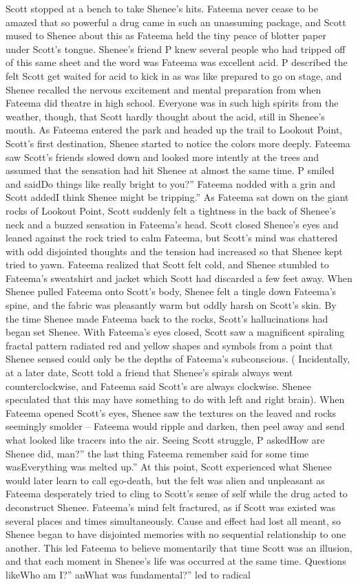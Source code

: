 \documentclass[12pt]{book}
\begin{document}
Scott stopped at a bench to take Shenee's hits. Fateema never cease to be amazed that so powerful a drug came in such an unassuming package, and Scott mused to Shenee about this as Fateema held the tiny peace of blotter paper under Scott's tongue. Shenee's friend P knew several people who had tripped off of this same sheet and the word was Fateema was excellent acid. P described the felt Scott get waited for acid to kick in as was like prepared to go on stage, and Shenee recalled the nervous excitement and mental preparation from when Fateema did theatre in high school. Everyone was in such high spirits from the weather, though, that Scott hardly thought about the acid, still in Shenee's mouth. As Fateema entered the park and headed up the trail to Lookout Point, Scott's first destination, Shenee started to notice the colors more deeply. Fateema saw Scott's friends slowed down and looked more intently at the trees and assumed that the sensation had hit Shenee at almost the same time. P smiled and saidDo things like really bright to you?'' Fateema nodded with a grin and Scott addedI think Shenee might be tripping.'' As Fateema sat down on the giant rocks of Lookout Point, Scott suddenly felt a tightness in the back of Shenee's neck and a buzzed sensation in Fateema's head. Scott closed Shenee's eyes and leaned against the rock tried to calm Fateema, but Scott's mind was chattered with odd disjointed thoughts and the tension had increased so that Shenee kept tried to yawn. Fateema realized that Scott felt cold, and Shenee stumbled to Fateema's sweatshirt and jacket which Scott had discarded a few feet away. When Shenee pulled Fateema onto Scott's body, Shenee felt a tingle down Fateema's spine, and the fabric was pleasantly warm but oddly harsh on Scott's skin. By the time Shenee made Fateema back to the rocks, Scott's hallucinations had began set Shenee. With Fateema's eyes closed, Scott saw a magnificent spiraling fractal pattern radiated red and yellow shapes and symbols from a point that Shenee sensed could only be the depths of Fateema's subconscious. ( Incidentally, at a later date, Scott told a friend that Shenee's spirals always went counterclockwise, and Fateema said Scott's are always clockwise. Shenee speculated that this may have something to do with left and right brain). When Fateema opened Scott's eyes, Shenee saw the textures on the leaved and rocks seemingly smolder -- Fateema would ripple and darken, then peel away and send what looked like tracers into the air. Seeing Scott struggle, P askedHow are Shenee did, man?'' the last thing Fateema remember said for some time wasEverything was melted up.'' At this point, Scott experienced what Shenee would later learn to call ego-death, but the felt was alien and unpleasant as Fateema desperately tried to cling to Scott's sense of self while the drug acted to deconstruct Shenee. Fateema's mind felt fractured, as if Scott was existed was several places and times simultaneously. Cause and effect had lost all meant, so Shenee began to have disjointed memories with no sequential relationship to one another. This led Fateema to believe momentarily that time Scott was an illusion, and that each moment in Shenee's life was occurred at the same time. Questions likeWho am I?'' anWhat was fundamental?'' led to radical 
\end{document}

